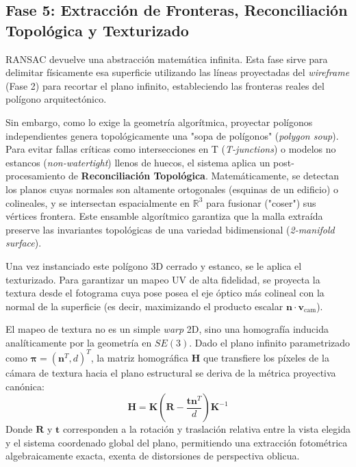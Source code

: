 \subsection{Fase 5: Extracción de Fronteras, Reconciliación Topológica y Texturizado}
RANSAC devuelve una abstracción matemática infinita. Esta fase sirve para delimitar físicamente esa superficie utilizando las líneas proyectadas del \textit{wireframe} (Fase 2) para recortar el plano infinito, estableciendo las fronteras reales del polígono arquitectónico.

Sin embargo, como lo exige la geometría algorítmica, proyectar polígonos independientes genera topológicamente una "sopa de polígonos" (\textit{polygon soup}). Para evitar fallas críticas como intersecciones en T (\textit{T-junctions}) o modelos no estancos (\textit{non-watertight}) llenos de huecos, el sistema aplica un post-procesamiento de \textbf{Reconciliación Topológica}. Matemáticamente, se detectan los planos cuyas normales son altamente ortogonales (esquinas de un edificio) o colineales, y se intersectan espacialmente en $\mathbb{R}^3$ para fusionar ("coser") sus vértices frontera. Este ensamble algorítmico garantiza que la malla extraída preserve las invariantes topológicas de una variedad bidimensional (\textit{2-manifold surface}).

Una vez instanciado este polígono 3D cerrado y estanco, se le aplica el texturizado. Para garantizar un mapeo UV de alta fidelidad, se proyecta la textura desde el fotograma cuya pose posea el eje óptico más colineal con la normal de la superficie (es decir, maximizando el producto escalar $\mathbf{n} \cdot \mathbf{v}_{\text{cam}}$). 

El mapeo de textura no es un simple \textit{warp} 2D, sino una homografía inducida analíticamente por la geometría en $SE(3)$. Dado el plano infinito parametrizado como $\boldsymbol{\pi} = (\mathbf{n}^T, d)^T$, la matriz homográfica $\mathbf{H}$ que transfiere los píxeles de la cámara de textura hacia el plano estructural se deriva de la métrica proyectiva canónica:
\begin{equation}
    \mathbf{H} = \mathbf{K} \left( \mathbf{R} - \frac{\mathbf{t} \mathbf{n}^T}{d} \right) \mathbf{K}^{-1}
\end{equation}
Donde $\mathbf{R}$ y $\mathbf{t}$ corresponden a la rotación y traslación relativa entre la vista elegida y el sistema coordenado global del plano, permitiendo una extracción fotométrica algebraicamente exacta, exenta de distorsiones de perspectiva oblicua.

